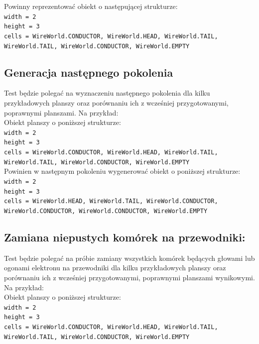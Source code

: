\documentclass{report}
\begin{document}
Powinny reprezentować obiekt o następującej strukturze:\\

\noindent \texttt{width = 2}\\
\texttt{height = 3}\\
\texttt{cells = {WireWorld.CONDUCTOR, WireWorld.HEAD, WireWorld.TAIL, WireWorld.TAIL, WireWorld.CONDUCTOR, WireWorld.EMPTY}}

\subsection{Generacja następnego pokolenia}
Test będzie polegać na wyznaczeniu następnego pokolenia dla kilku przykładowych planszy oraz porównaniu ich z wcześniej przygotowanymi, poprawnymi planszami. Na przykład:\\

Obiekt planszy o poniższej strukturze:\\

\noindent \texttt{width = 2}\\
\texttt{height = 3}\\
\texttt{cells = {WireWorld.CONDUCTOR, WireWorld.HEAD, WireWorld.TAIL, WireWorld.TAIL, WireWorld.CONDUCTOR, WireWorld.EMPTY}}\\

Powinien w następnym pokoleniu wygenerować obiekt o poniższej strukturze:\\

\noindent \texttt{width = 2}\\
\texttt{height = 3}\\
\texttt{cells = {WireWorld.HEAD, WireWorld.TAIL, WireWorld.CONDUCTOR, WireWorld.CONDUCTOR, WireWorld.CONDUCTOR, WireWorld.EMPTY}}\\

\subsection{Zamiana niepustych komórek na przewodniki:}
Test będzie polegać na próbie zamiany wszystkich komórek będących głowami lub ogonami elektronu na przewodniki dla kilku przykładowych planszy oraz porównaniu ich z wcześniej przygotowanymi, poprawnymi planszami wynikowymi. Na przykład:\\

Obiekt planszy o poniższej strukturze:\\

\noindent \texttt{width = 2}\\
\texttt{height = 3}\\
\texttt{cells = {WireWorld.CONDUCTOR, WireWorld.HEAD, WireWorld.TAIL, WireWorld.TAIL, WireWorld.CONDUCTOR, WireWorld.EMPTY}}\\
\end{document}

